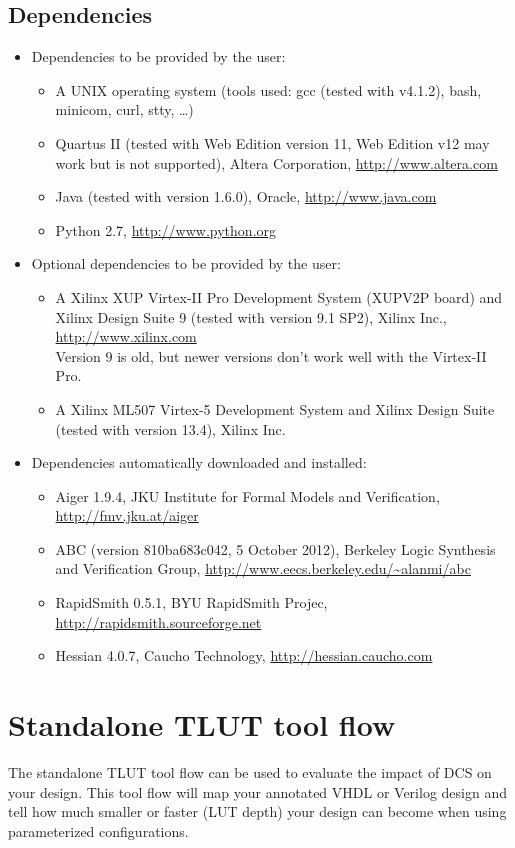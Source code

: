 \documentclass[a4paper,oneside]{memoir}
\begin{document}
\section{Dependencies}
\begin{itemize}
\item Dependencies to be provided by the user:
\begin{itemize}
\item A UNIX operating system (tools used: gcc (tested with v4.1.2), bash, minicom, curl, stty, \dots)
\item Quartus II (tested with Web Edition version 11, Web Edition v12 may work but is not supported), Altera Corporation, \url{http://www.altera.com}
\item Java (tested with version 1.6.0), Oracle, \url{http://www.java.com}
\item Python 2.7, \url{http://www.python.org}
\end{itemize}
\item Optional dependencies to be provided by the user:
\begin{itemize}
\item A Xilinx XUP Virtex-II Pro Development System (XUPV2P board) and Xilinx Design Suite 9 (tested with version 9.1 SP2), Xilinx Inc., \url{http://www.xilinx.com}\\ %
Version 9 is old, but newer versions don't work well with the Virtex-II Pro.
\item A Xilinx ML507 Virtex-5 Development System and Xilinx Design Suite (tested with version 13.4), Xilinx Inc.
\end{itemize}
\item Dependencies automatically downloaded and installed:
\begin{itemize}
\item Aiger 1.9.4, JKU Institute for Formal Models and Verification, \url{http://fmv.jku.at/aiger}
\item ABC (version 810ba683c042, 5 October 2012), Berkeley Logic Synthesis and Verification Group, \url{http://www.eecs.berkeley.edu/\~alanmi/abc}
\item RapidSmith 0.5.1, BYU RapidSmith Projec,  \url{http://rapidsmith.sourceforge.net}
\item Hessian 4.0.7, Caucho Technology, \url{http://hessian.caucho.com}
\end{itemize}
\end{itemize}

\clearpage
\chapter{Standalone TLUT tool flow}\label{sec:standalone_flow}
The standalone TLUT tool flow can be used to evaluate the impact of DCS on your design. This tool flow will map your annotated VHDL or Verilog design and tell how much smaller or faster (LUT depth) your design can become when using parameterized configurations.
\end{document}
